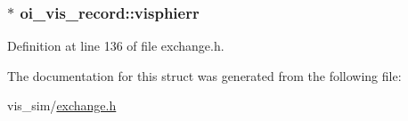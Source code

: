 \hypertarget{structoi__vis__record_a5a8b83e5f4f8af4ff64a58c460552820}{
\subsubsection[{visphierr}]{ $\ast$ {\bf oi\_\-vis\_\-record::visphierr}}}
\label{structoi__vis__record_a5a8b83e5f4f8af4ff64a58c460552820}


Definition at line 136 of file exchange.h.



The documentation for this struct was generated from the following file:\begin{DoxyCompactItemize}
\item 
vis\_\-sim/\hyperlink{exchange_8h}{exchange.h}\end{DoxyCompactItemize}
